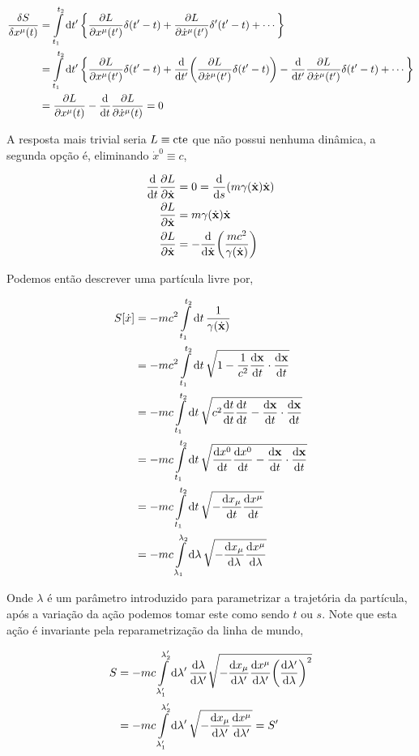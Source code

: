 \documentclass[twoside]{amsart}
\numberwithin{equation}{section}
\begin{document}
\begin{align}
    \fdv{S}{x^\mu\qty(t)}&=\int\limits_{t_1}^{t_2}\dd{t'}\qty{\pdv{L}{x^\mu\qty(t')}\delta\qty(t'-t)+\pdv{L}{{\dot x}^\mu\qty(t')}\delta'\qty(t'-t)+\cdots}\\
    &=\int\limits_{t_1}^{t_2}\dd{t'}\qty{\pdv{L}{x^\mu\qty(t')}\delta\qty(t'-t)+\dv{}{t'}\qty(\pdv{L}{{\dot x}^\mu\qty(t')}\delta\qty(t'-t))-\dv{}{t'}\pdv{L}{{\dot x}^\mu\qty(t')}\delta\qty(t'-t)+\cdots}\\
    &=\pdv{L}{x^\mu\qty(t)}-\dv{}{t}\pdv{L}{{\dot x}^\mu\qty(t)}=0
\end{align}

A resposta mais trivial seria $L\equiv \textup{cte}$ que não possui nenhuma dinâmica, a segunda opção é, eliminando ${\dot x}^0\equiv c$,

\begin{align}
    \dv{}{t}\pdv{L}{\dot{\vb x}}&=0=\dv{}{s}\qty(m\gamma\qty(\dot{\vb x})\dot{\vb x})\\
    \pdv{L}{\dot{\vb x}}&=m\gamma\qty(\dot {\vb x})\dot{\vb x}\\
    \pdv{L}{\dot{\vb x}}&=-\dv{}{\dot{\vb x}}\qty(\frac{mc^2}{\gamma\qty(\dot{\vb x})})
\end{align}

Podemos então descrever uma partícula livre por,

\begin{align}
    S[\dot x]&=-mc^2\int\limits_{t_1}^{t_2}\dd{t}\frac{1}{\gamma\qty(\dot{\vb x})}\\
    &=-mc^2\int\limits_{t_1}^{t_2}\dd{t}\sqrt{1-\frac{1}{c^2}\dv{\vb x}{t}\cdot\dv{\vb x}{t}}\\
    &=-mc\int\limits_{t_1}^{t_2}\dd{t}\sqrt{c^2\dv{t}{t}\dv{t}{t}-\dv{\vb x}{t}\cdot\dv{\vb x}{t}}\\
    &=-mc\int\limits_{t_1}^{t_2}\dd{t}\sqrt{\dv{x^0}{t}\dv{x^0}{t}-\dv{\vb x}{t}\cdot\dv{\vb x}{t}}\\
    &=-mc\int\limits_{t_1}^{t_2}\dd{t}\sqrt{-\dv{x_\mu}{t}\dv{x^\mu}{t}}\\
    &=-mc\int\limits_{\lambda_1}^{\lambda_2}\dd{\lambda}\sqrt{-\dv{x_\mu}{\lambda}\dv{x^\mu}{\lambda}}
\end{align}

Onde $\lambda$ é um parâmetro introduzido para parametrizar a trajetória da partícula, após a variação da ação podemos tomar este como sendo $t$ ou $s$. Note que esta ação é invariante pela reparametrização da linha de mundo,

\begin{align}
    S&=-mc\int\limits_{\lambda_1'}^{\lambda_2'}\dd{\lambda'}\dv{\lambda}{\lambda'}\sqrt{-\dv{x_\mu}{\lambda'}\dv{x^\mu}{\lambda'}\qty(\dv{\lambda'}{\lambda})^2}\\
    &=-mc\int\limits_{\lambda_1'}^{\lambda_2'}\dd{\lambda'}\sqrt{-\dv{x_\mu}{\lambda'}\dv{x^\mu}{\lambda'}}=S'
\end{align}
\end{document}
